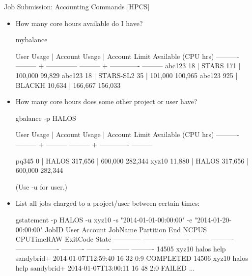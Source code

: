 \begin{frame}[fragile]{Job Submission: Accounting Commands [HPCS]}
\begin{itemize}
\item{How many core hours available do I have?}
\begin{semiverbatim}
\tiny
mybalance

User            Usage |        Account     Usage | Account Limit Available (CPU hrs)
----------  --------- + -------------- --------- + ------------- ---------
abc123             18 |          STARS       171 |       100,000    {\color{red}99,829}
abc123             18 |      STARS-SL2        35 |       101,000   {\color{red}100,965}
abc123            925 |         BLACKH    10,634 |       166,667   {\color{red}156,033}
\end{semiverbatim}
\smallskip
\item{How many core hours does some other project or user have?}
\begin{semiverbatim}
\tiny
gbalance -p HALOS

User           Usage |   Account     Usage | Account Limit Available (CPU hrs)
---------- --------- + --------- --------- + ------------- ---------

pq345              0 |     HALOS   317,656 |       600,000   {\color{red}282,344}
xyz10         11,880 |     HALOS   317,656 |       600,000   {\color{red}282,344}

(Use -u for user.)
\end{semiverbatim}
\smallskip
\item{List all jobs charged to a project/user between certain times:}
\begin{semiverbatim}
\Tiny
gstatement -p HALOS  -u xyz10 -s "2014-01-01-00:00:00" -e "2014-01-20-00:00:00" 
       JobID      User   Account  JobName  Partition                 End      NCPUS CPUTimeRAW ExitCode      State 
------------ --------- ---------- -------- ---------- ------------------- ---------- ---------- -------- ---------- 
14505            xyz10    halos       help sandybrid+ 2014-01-07T12:59:40         16         32      0:9  COMPLETED 
14506            xyz10    halos       help sandybrid+ 2014-01-07T13:00:11         16         48      2:0     FAILED
...
\end{semiverbatim}
\end{itemize}
\end{frame}


